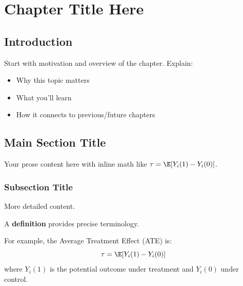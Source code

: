 %
%

\chapter{Chapter Title Here}


\section{Introduction}

Start with motivation and overview of the chapter. Explain:
\begin{itemize}
    \item Why this topic matters
    \item What you'll learn
    \item How it connects to previous/future chapters
\end{itemize}


\section{Main Section Title}

Your prose content here with inline math like $\tau = \E[Y_i(1) - Y_i(0)]$.

\subsection{Subsection Title}

More detailed content.


\begin{definition}
\label{def:short_name}
A \textbf{definition} provides precise terminology.

For example, the Average Treatment Effect (ATE) is:
\[
\tau = \E[Y_i(1) - Y_i(0)]
\]
where $Y_i(1)$ is the potential outcome under treatment and $Y_i(0)$ under control.
\end{definition}

